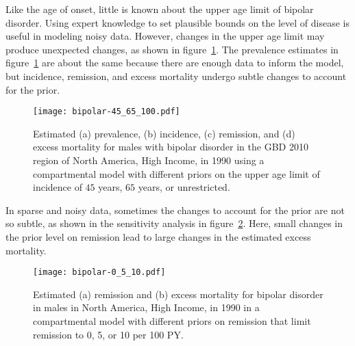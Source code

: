 Like the age of onset, little is known about the upper age limit of
bipolar disorder.  Using expert knowledge to set plausible bounds on the
level of disease is useful in modeling noisy data.  However, changes in the upper age
limit may produce unexpected changes, as shown in figure~\ref{fig:app-bipolar onset}.
The prevalence estimates in figure~\ref{fig:app-bipolar onset} are about
the same because there are enough data to inform the model, but incidence,
remission, and excess mortality undergo subtle changes to account for the prior.

    \begin{figure}[h]
        \begin{center}
            \texttt{[image: bipolar-45\_65\_100.pdf]}
            \caption[Comparison of estimates for bipolar disorder using
              a compartmental model with different priors on the upper
              age limit of incidence.]{Estimated (a) prevalence, (b)
              incidence, (c) remission, and
              (d) excess mortality for males with bipolar
              disorder in the GBD 2010 region of North America, High Income,
              in 1990 using a compartmental model with
              different priors on the upper age limit of
              incidence of $45$ years, $65$ years, or unrestricted.}
            \label{fig:app-bipolar onset}
        \end{center}
    \end{figure}

In sparse and noisy data, sometimes the changes to account for the prior
are not so subtle, as shown in the sensitivity analysis in
figure~\ref{fig:app-bipolar remission}.  Here, small changes in the
prior level on remission lead to large changes in the estimated excess mortality.

    \begin{figure}[h]
        \begin{center}
            \texttt{[image: bipolar-0\_5\_10.pdf]}
            \caption[Comparison of estimates for bipolar disorder using a
              compartmental model with different priors on remission.]{Estimated
              (a) remission and (b) excess
              mortality for bipolar disorder in
              males in North America, High Income,
              in 1990 in a compartmental model
              with different priors on remission that limit remission
              to 0, 5, or 10 per 100 PY.}
            \label{fig:app-bipolar remission}
        \end{center}
    \end{figure}

